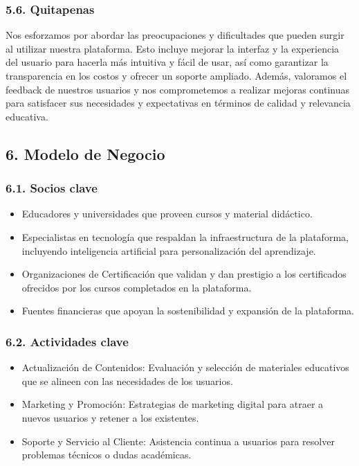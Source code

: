 \documentclass[
]{article}
\providecommand{\tightlist}{%
  \setlength{\itemsep}{0pt}\setlength{\parskip}{0pt}}
\begin{document}
\subsubsection{5.6. Quitapenas}\label{quitapenas}

Nos esforzamos por abordar las preocupaciones y dificultades que pueden
surgir al utilizar nuestra plataforma. Esto incluye mejorar la interfaz
y la experiencia del usuario para hacerla más intuitiva y fácil de usar,
así como garantizar la transparencia en los costos y ofrecer un soporte
ampliado. Además, valoramos el feedback de nuestros usuarios y nos
comprometemos a realizar mejoras continuas para satisfacer sus
necesidades y expectativas en términos de calidad y relevancia
educativa.

\newpage

\subsection{6. Modelo de Negocio}\label{modelo-de-negocio}

\subsubsection{6.1. Socios clave}\label{socios-clave}

\begin{itemize}
\tightlist
\item
  Educadores y universidades que proveen cursos y material didáctico.
\item
  Especialistas en tecnología que respaldan la infraestructura de la
  plataforma, incluyendo inteligencia artificial para personalización
  del aprendizaje.
\item
  Organizaciones de Certificación que validan y dan prestigio a los
  certificados ofrecidos por los cursos completados en la plataforma.
\item
  Fuentes financieras que apoyan la sostenibilidad y expansión de la
  plataforma.
\end{itemize}

\subsubsection{6.2. Actividades clave}\label{actividades-clave}

\begin{itemize}
\tightlist
\item
  Actualización de Contenidos: Evaluación y selección de materiales
  educativos que se alineen con las necesidades de los usuarios.
\item
  Marketing y Promoción: Estrategias de marketing digital para atraer a
  nuevos usuarios y retener a los existentes.
\item
  Soporte y Servicio al Cliente: Asistencia continua a usuarios para
  resolver problemas técnicos o dudas académicas.
\end{itemize}
\end{document}
